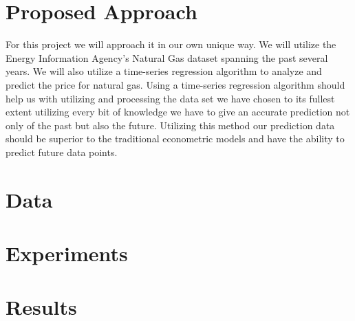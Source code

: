 \documentclass[final]{cvpr}
\begin{document}
\section{Proposed Approach}

For this project we will approach it in our own unique way. We will utilize the
Energy Information Agency's Natural Gas dataset spanning the past several
years. We will also utilize a time-series regression algorithm to analyze and
predict the price for natural gas. Using a time-series regression algorithm
should help us with utilizing and processing the data set we have chosen to its
fullest extent utilizing every bit of knowledge we have to give an accurate
prediction not only of the past but also the future. Utilizing this method our
prediction data should be superior to the traditional econometric models and
have the ability to predict future data points.

\section{Data}


\section{Experiments}


\section{Results}


\nocite{*}

{\small
    
    
}
\end{document}
